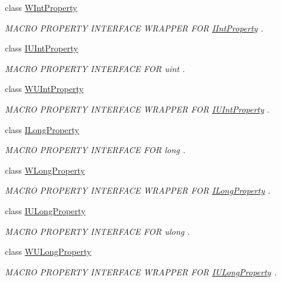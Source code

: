 \begin{DoxyCompactItemize}
class \hyperlink{class_w_int_property}{W\-Int\-Property}
\begin{DoxyCompactList}\small\item\em M\-A\-C\-R\-O P\-R\-O\-P\-E\-R\-T\-Y I\-N\-T\-E\-R\-F\-A\-C\-E W\-R\-A\-P\-P\-E\-R F\-O\-R \hyperlink{class_i_int_property}{I\-Int\-Property} . \end{DoxyCompactList}\item 
class \hyperlink{class_i_u_int_property}{I\-U\-Int\-Property}
\begin{DoxyCompactList}\small\item\em M\-A\-C\-R\-O P\-R\-O\-P\-E\-R\-T\-Y I\-N\-T\-E\-R\-F\-A\-C\-E F\-O\-R uint . \end{DoxyCompactList}\item 
class \hyperlink{class_w_u_int_property}{W\-U\-Int\-Property}
\begin{DoxyCompactList}\small\item\em M\-A\-C\-R\-O P\-R\-O\-P\-E\-R\-T\-Y I\-N\-T\-E\-R\-F\-A\-C\-E W\-R\-A\-P\-P\-E\-R F\-O\-R \hyperlink{class_i_u_int_property}{I\-U\-Int\-Property} . \end{DoxyCompactList}\item 
class \hyperlink{class_i_long_property}{I\-Long\-Property}
\begin{DoxyCompactList}\small\item\em M\-A\-C\-R\-O P\-R\-O\-P\-E\-R\-T\-Y I\-N\-T\-E\-R\-F\-A\-C\-E F\-O\-R long . \end{DoxyCompactList}\item 
class \hyperlink{class_w_long_property}{W\-Long\-Property}
\begin{DoxyCompactList}\small\item\em M\-A\-C\-R\-O P\-R\-O\-P\-E\-R\-T\-Y I\-N\-T\-E\-R\-F\-A\-C\-E W\-R\-A\-P\-P\-E\-R F\-O\-R \hyperlink{class_i_long_property}{I\-Long\-Property} . \end{DoxyCompactList}\item 
class \hyperlink{class_i_u_long_property}{I\-U\-Long\-Property}
\begin{DoxyCompactList}\small\item\em M\-A\-C\-R\-O P\-R\-O\-P\-E\-R\-T\-Y I\-N\-T\-E\-R\-F\-A\-C\-E F\-O\-R ulong . \end{DoxyCompactList}\item 
class \hyperlink{class_w_u_long_property}{W\-U\-Long\-Property}
\begin{DoxyCompactList}\small\item\em M\-A\-C\-R\-O P\-R\-O\-P\-E\-R\-T\-Y I\-N\-T\-E\-R\-F\-A\-C\-E W\-R\-A\-P\-P\-E\-R F\-O\-R \hyperlink{class_i_u_long_property}{I\-U\-Long\-Property} . \end{DoxyCompactList}\item 

\end{DoxyCompactItemize}
